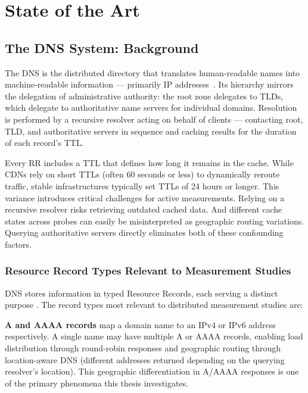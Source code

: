 \chapter{State of the Art}
\label{ch:state-of-the-art}

\section{The DNS System: Background}
\label{subsec:2.1}

The \ac{DNS} is the distributed directory that translates human-readable names into machine-readable information — primarily \ac{IP} addresses~\cite{RFC1034,RFC1035}. Its hierarchy mirrors the delegation of administrative authority: the root zone delegates to \ac{TLD}s, which delegate to authoritative name servers for individual domains. Resolution is performed by a recursive resolver acting on behalf of clients — contacting root, \ac{TLD}, and authoritative servers in sequence and caching results for the duration of each record’s \ac{TTL}.

Every \ac{RR} includes a \ac{TTL} that defines how long it remains in the cache. While \ac{CDN}s rely on short \ac{TTL}s (often 60 seconds or less) to dynamically reroute traffic, stable infrastructures typically set \ac{TTL}s of 24 hours or longer. This variance introduces critical challenges for active measurements. Relying on a recursive resolver risks retrieving outdated cached data. And different cache states across probes can easily be misinterpreted as geographic routing variations. Querying authoritative servers directly eliminates both of these confounding factors.

\subsection{Resource Record Types Relevant to Measurement Studies}
\label{sec:2.1.1}

\ac{DNS} stores information in typed Resource Records, each serving a distinct purpose \cite{RFC1035}. The record types most relevant to distributed measurement studies are:

\textbf{\ac{A} and \ac{AAAA} records} map a domain name to an \ac{IPv4} or \ac{IPv6} address respectively. A single name may have multiple \ac{A} or \ac{AAAA} records, enabling load distribution through round-robin responses and geographic routing through location-aware \ac{DNS} (different addresses returned depending on the querying resolver's location). This geographic differentiation in \ac{A}/\ac{AAAA} responses is one of the primary phenomena this thesis investigates.

